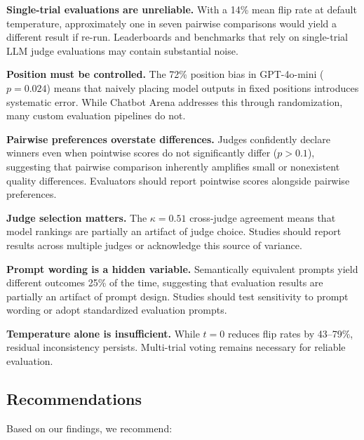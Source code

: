 \documentclass{ijclclp}
\begin{document}
\textbf{Single-trial evaluations are unreliable.} With a 14\% mean flip rate at default temperature, approximately one in seven pairwise comparisons would yield a different result if re-run. Leaderboards and benchmarks that rely on single-trial LLM judge evaluations may contain substantial noise.

\textbf{Position must be controlled.} The 72\% position bias in GPT-4o-mini ($p = 0.024$) means that naively placing model outputs in fixed positions introduces systematic error. While Chatbot Arena addresses this through randomization, many custom evaluation pipelines do not.

\textbf{Pairwise preferences overstate differences.} Judges confidently declare winners even when pointwise scores do not significantly differ ($p > 0.1$), suggesting that pairwise comparison inherently amplifies small or nonexistent quality differences. Evaluators should report pointwise scores alongside pairwise preferences.

\textbf{Judge selection matters.} The $\kappa = 0.51$ cross-judge agreement means that model rankings are partially an artifact of judge choice. Studies should report results across multiple judges or acknowledge this source of variance.

\textbf{Prompt wording is a hidden variable.} Semantically equivalent prompts yield different outcomes 25\% of the time, suggesting that evaluation results are partially an artifact of prompt design. Studies should test sensitivity to prompt wording or adopt standardized evaluation prompts.

\textbf{Temperature alone is insufficient.} While $t=0$ reduces flip rates by 43--79\%, residual inconsistency persists. Multi-trial voting remains necessary for reliable evaluation.

\subsection{Recommendations}

Based on our findings, we recommend:
\end{document}
